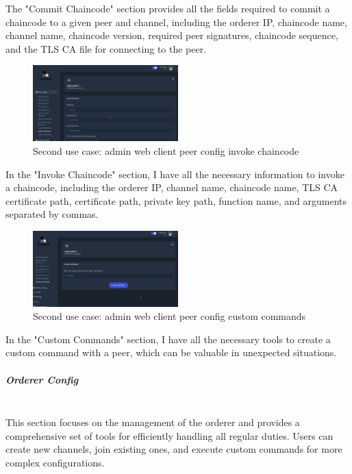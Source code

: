 The "Commit Chaincode" section provides all the fields required to commit a chaincode to a given peer and channel, including the orderer IP, chaincode name, channel name, chaincode version, required peer signatures, chaincode sequence, and the TLS CA file for connecting to the peer.

\begin{figure}[H]
    \centering
    \includegraphics[width=0.5\textwidth]{assets/use-case-2/peer-config-invoke-chaincode.png} %
    \caption{Second use case: admin web client peer config invoke chaincode}
    \label{fig:sample-image} 
\end{figure}

In the "Invoke Chaincode" section, I have all the necessary information to invoke a chaincode, including the orderer IP, channel name, chaincode name, TLS CA certificate path, certificate path, private key path, function name, and arguments separated by commas.

\begin{figure}[H]
    \centering
    \includegraphics[width=0.5\textwidth]{assets/use-case-2/peer-config-custom-commands.png} %
    \caption{Second use case: admin web client peer config custom commands}
    \label{fig:sample-image} 
\end{figure}

In the "Custom Commands" section, I have all the necessary tools to create a custom command with a peer, which can be valuable in unexpected situations.

\subparagraph{Orderer Config}\mbox{}\\
This section focuses on the management of the orderer and provides a comprehensive set of tools for efficiently handling all regular duties. Users can create new channels, join existing ones, and execute custom commands for more complex configurations.

